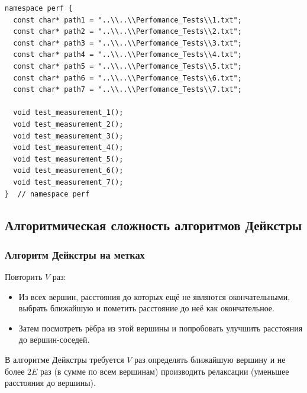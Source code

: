 \begin{text}
\begin{lstlisting}[breaklines=true]
namespace perf {
  const char* path1 = "..\\..\\Perfomance_Tests\\1.txt";
  const char* path2 = "..\\..\\Perfomance_Tests\\2.txt";
  const char* path3 = "..\\..\\Perfomance_Tests\\3.txt";
  const char* path4 = "..\\..\\Perfomance_Tests\\4.txt";
  const char* path5 = "..\\..\\Perfomance_Tests\\5.txt";
  const char* path6 = "..\\..\\Perfomance_Tests\\6.txt";
  const char* path7 = "..\\..\\Perfomance_Tests\\7.txt";

  void test_measurement_1();
  void test_measurement_2();
  void test_measurement_3();
  void test_measurement_4();
  void test_measurement_5();
  void test_measurement_6();
  void test_measurement_7();
}  // namespace perf
\end{lstlisting}
\newpage

\subsection{Алгоритмическая сложность алгоритмов Дейкстры}
\subsubsection{Алгоритм Дейкстры на метках}

Повторить $V$ раз:
\begin{itemize}
	\item Из всех вершин, расстояния до которых ещё не являются окончательными, выбрать ближайшую и пометить расстояние до неё как окончательное.
	\item Затем посмотреть рёбра из этой вершины и попробовать улучшить расстояния до вершин-соседей.
\end{itemize}

В алгоритме Дейкстры требуется $V$ раз определять ближайшую вершину и не более $2E$ раз (в сумме по всем вершинам) производить релаксации (уменьшее расстояния до вершины).\\


\end{text}
